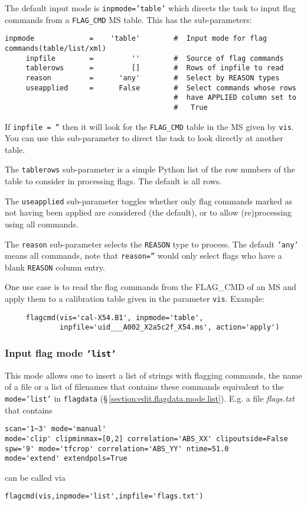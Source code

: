 The default input mode is {\tt inpmode='table'} which directs the
task to input flag commands from a {\tt FLAG\_CMD} MS table.  
This has the sub-parameters:
\small
\begin{verbatim}
inpmode             =    'table'        #  Input mode for flag commands(table/list/xml)
     inpfile        =         ''        #  Source of flag commands
     tablerows      =         []        #  Rows of inpfile to read
     reason         =      'any'        #  Select by REASON types
     useapplied     =      False        #  Select commands whose rows
                                        #  have APPLIED column set to
                                        #   True
\end{verbatim}
\normalsize

If {\tt inpfile = ''} then it will look for the {\tt FLAG\_CMD} 
table in the MS given by {\tt vis}. You can use this sub-parameter to
direct the task to look directly at another table.

The {\tt tablerows} sub-parameter is a simple Python list of the row
numbers of the table to consider in processing flags.  The default is
all rows.

The {\tt useapplied} sub-parameter toggles whether only flag commands
marked as not having been applied are considered (the default), or
to allow (re)processing using all commands.

The {\tt reason} sub-parameter selects the {\tt REASON} type to
process.  The default {\tt 'any'} means all commands, note that
{\tt reason=''} would only select flags who have a blank {\tt REASON}
column entry.

One use case is to read the flag commands from the FLAG\_CMD of an MS
and apply them to a calibration table given in the parameter
{\tt vis}. Example:

\small
\begin{verbatim}
     flagcmd(vis='cal-X54.B1', inpmode='table', 
             inpfile='uid___A002_X2a5c2f_X54.ms', action='apply')
\end{verbatim}
\normalsize

\subsubsection{Input flag mode {\tt 'list'}}
\label{section:edit.flagcmd.inpmode.list}
This mode allows one to insert a list of strings with flagging
commands, the name of a ﬁle or a list of filenames that contains these
commands equivalent to the {\tt mode='list'} in {\tt flagdata}
(\S\,\ref{section:edit.flagdata.mode.list}). E.g. a file {\it
  flags.txt} that contains \small
\begin{verbatim}
scan='1~3' mode='manual'
mode='clip' clipminmax=[0,2] correlation='ABS_XX' clipoutside=False
spw='9' mode='tfcrop' correlation='ABS_YY' ntime=51.0
mode='extend' extendpols=True
\end{verbatim}
\normalsize
can be called via  
\small
\begin{verbatim}
flagcmd(vis,inpmode='list',inpfile='flags.txt')
\end{verbatim}
\normalsize

